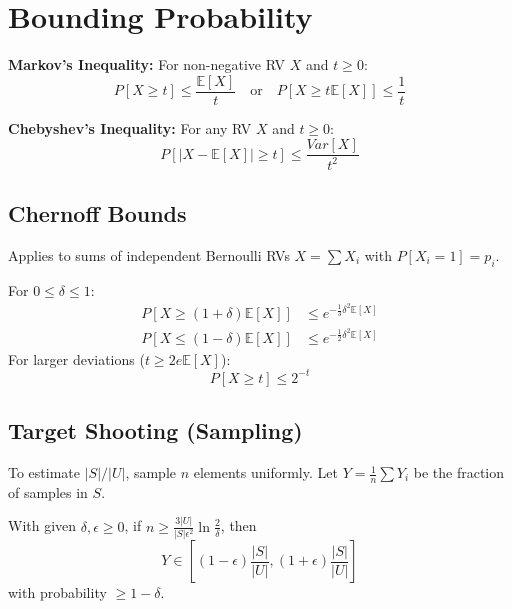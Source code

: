 \section{Bounding Probability}

\begin{theorem}
    \textbf{Markov's Inequality:} For non-negative RV $X$ and $t \ge 0$:
    $$P[X \geq t] \leq \frac{\mathbb{E}[X]}{t} \quad \text{or} \quad P[X \geq t \mathbb{E}[X]] \leq \frac{1}{t}$$
\end{theorem}

\begin{theorem}
    \textbf{Chebyshev's Inequality:} For any RV $X$ and $t \ge 0$:
    $$P[|X-\mathbb{E}[X]| \geq t] \leq \frac{Var[X]}{t^2}$$
\end{theorem}

\subsection{Chernoff Bounds}

Applies to sums of independent Bernoulli RVs $X = \sum X_i$ with $P[X_i=1]=p_i$.
\begin{theorem}
    For $0 \leq \delta \leq 1$:
    \begin{align*}
        P[X \geq (1+\delta)\mathbb{E}[X]] &\leq e^{-\frac{1}{3}\delta^2\mathbb{E}[X]} \\
        P[X \leq (1-\delta)\mathbb{E}[X]] &\leq e^{-\frac{1}{2}\delta^2\mathbb{E}[X]}
    \end{align*}
    For larger deviations ($t \geq 2 e \mathbb{E}[X]$):
    $$P[X \geq t] \leq 2^{-t}$$
\end{theorem}

\subsection{Target Shooting (Sampling)}
To estimate $|S|/|U|$, sample $n$ elements uniformly. Let $Y = \frac{1}{n} \sum Y_i$ be the fraction of samples in $S$.
\begin{theorem}
    With given $\delta, \epsilon \ge 0$, if $n \geq \frac{3 |U|}{|S| \epsilon^2} \ln \frac{2}{\delta}$, then 
    $$Y \in \left[(1-\epsilon)\frac{|S|}{|U|}, (1+\epsilon)\frac{|S|}{|U|}\right]$$
    with probability $\ge 1-\delta$.
\end{theorem}
